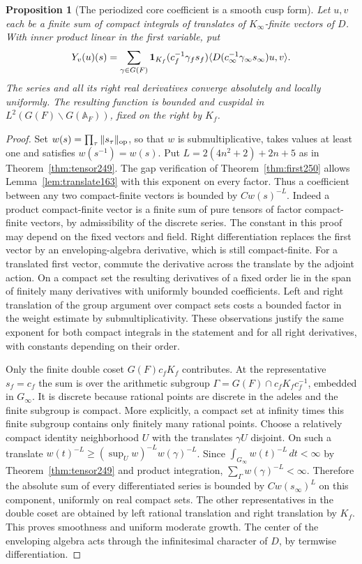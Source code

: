 \documentclass[a4paper,11pt]{article}
\newtheorem{proposition}{Proposition}[section]
\theoremstyle{definition}
\theoremstyle{remark}
\numberwithin{equation}{section}
\begin{document}
\begin{proposition}[The periodized core coefficient is a smooth cusp form]
\label{prop:corecusp251}
Let \(u,v\) each be a finite sum of compact integrals of translates of
\(K_\infty\)-finite vectors of \(D\). With inner product linear in the
first variable, put
\[
 Y_v(u)(s)=\sum_{\gamma\in G(F)}
 {\bf1}_{K_f}(c_f^{-1}\gamma_f s_f)
 \langle D(c_\infty^{-1}\gamma_\infty s_\infty)u,v\rangle .
\]
The series and all its right real derivatives converge absolutely and
locally uniformly. The resulting function is bounded and cuspidal in
\(L^2(G(F)\backslash G(\mathbb A_F))\), fixed on the right by \(K_f\).
\end{proposition}
\begin{proof}
Set \(w(s)=\prod_{\tau}\|s_\tau\|_{\rm op}\), so that \(w\) is
submultiplicative, takes values at least one and satisfies
\(w(s^{-1})=w(s)\). Put \(L=2(4n^2+2)+2n+5\) as in
Theorem~\ref{thm:tensor249}. The gap verification of
Theorem~\ref{thm:first250} allows Lemma~\ref{lem:translate163} with
this exponent on every factor. Thus a coefficient between any two
compact-finite vectors is bounded by \(Cw(s)^{-L}\). Indeed a
product compact-finite vector is a finite sum of pure tensors of
factor compact-finite vectors, by admissibility of the discrete
series. The constant in this proof may depend on the fixed vectors
and field. Right differentiation replaces the first vector by an
enveloping-algebra derivative, which is still compact-finite. For
a translated first vector, commute the derivative across the translate
by the adjoint action. On a compact set the resulting derivatives of
a fixed order lie in the span of finitely many derivatives with
uniformly bounded coefficients. Left and right translation of the
group argument over compact sets costs a bounded factor in the weight
estimate by submultiplicativity. These observations justify the same
exponent for both compact integrals in the statement and for all
right derivatives, with constants depending on their order.

Only the finite double coset \(G(F)c_fK_f\) contributes. At the
representative \(s_f=c_f\) the sum is over the arithmetic subgroup
\(\Gamma=G(F)\cap c_fK_fc_f^{-1}\), embedded in \(G_\infty\).
It is discrete because rational points are discrete in the adeles
and the finite subgroup is compact. More explicitly, a compact set
at infinity times this finite subgroup contains only finitely many
rational points. Choose a relatively compact identity neighborhood
\(U\) with the translates \(\gamma U\) disjoint. On such a translate
\(w(t)^{-L}\ge (\sup_U w)^{-L} w(\gamma)^{-L}\). Since
\(\int_{G_\infty} w(t)^{-L}\,dt<\infty\) by Theorem~\ref{thm:tensor249}
and product integration, \(\sum_{\Gamma}w(\gamma)^{-L}<\infty\).
Therefore the absolute sum of every differentiated series is bounded by
\(C w(s_\infty)^L\) on this component, uniformly on real compact sets.
The other representatives in the double coset are obtained by left
rational translation and right translation by \(K_f\). This proves
smoothness and uniform moderate growth. The center of the enveloping
algebra acts through the infinitesimal character of \(D\), by termwise
differentiation.


\end{proof}
\end{document}
